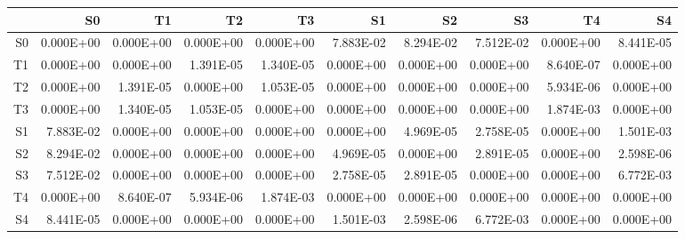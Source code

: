 \begin{tabular}{r|rrrrrrrrr}
 &          S0 &          T1 &          T2 &          T3 &          S1 &          S2 &          S3 &          T4 &          S4 \\
\hline
S0 &  0.000E+00 &  0.000E+00 &  0.000E+00 &  0.000E+00 &  7.883E-02 &  8.294E-02 &  7.512E-02 &  0.000E+00 &  8.441E-05 \\
T1 &  0.000E+00 &  0.000E+00 &  1.391E-05 &  1.340E-05 &  0.000E+00 &  0.000E+00 &  0.000E+00 &  8.640E-07 &  0.000E+00 \\
T2 &  0.000E+00 &  1.391E-05 &  0.000E+00 &  1.053E-05 &  0.000E+00 &  0.000E+00 &  0.000E+00 &  5.934E-06 &  0.000E+00 \\
T3 &  0.000E+00 &  1.340E-05 &  1.053E-05 &  0.000E+00 &  0.000E+00 &  0.000E+00 &  0.000E+00 &  1.874E-03 &  0.000E+00 \\
S1 &  7.883E-02 &  0.000E+00 &  0.000E+00 &  0.000E+00 &  0.000E+00 &  4.969E-05 &  2.758E-05 &  0.000E+00 &  1.501E-03 \\
S2 &  8.294E-02 &  0.000E+00 &  0.000E+00 &  0.000E+00 &  4.969E-05 &  0.000E+00 &  2.891E-05 &  0.000E+00 &  2.598E-06 \\
S3 &  7.512E-02 &  0.000E+00 &  0.000E+00 &  0.000E+00 &  2.758E-05 &  2.891E-05 &  0.000E+00 &  0.000E+00 &  6.772E-03 \\
T4 &  0.000E+00 &  8.640E-07 &  5.934E-06 &  1.874E-03 &  0.000E+00 &  0.000E+00 &  0.000E+00 &  0.000E+00 &  0.000E+00 \\
S4 &  8.441E-05 &  0.000E+00 &  0.000E+00 &  0.000E+00 &  1.501E-03 &  2.598E-06 &  6.772E-03 &  0.000E+00 &  0.000E+00 \\
\end{tabular}
